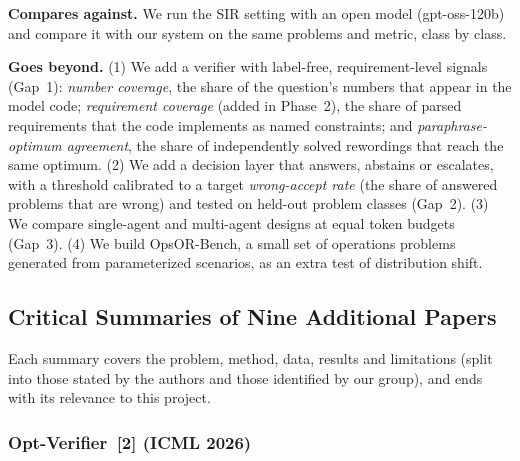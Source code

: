 \documentclass[11pt,a4paper]{article}
\begin{document}
\textbf{Compares against.} We run the SIR setting with an open model (gpt-oss-120b) and compare it with our system on the same problems and metric, class by class.

\textbf{Goes beyond.} (1) We add a verifier with label-free, requirement-level signals (Gap~1): \textit{number coverage}, the share of the question's numbers that appear in the model code; \textit{requirement coverage} (added in Phase~2), the share of parsed requirements that the code implements as named constraints; and \textit{paraphrase-optimum agreement}, the share of independently solved rewordings that reach the same optimum. (2) We add a decision layer that answers, abstains or escalates, with a threshold calibrated to a target \textit{wrong-accept rate} (the share of answered problems that are wrong) and tested on held-out problem classes (Gap~2). (3) We compare single-agent and multi-agent designs at equal token budgets (Gap~3). (4) We build OpsOR-Bench, a small set of operations problems generated from parameterized scenarios, as an extra test of distribution shift.

\subsection{Critical Summaries of Nine Additional Papers}
\label{sec:summaries}

Each summary covers the problem, method, data, results and limitations (split into those stated by the authors and those identified by our group), and ends with its relevance to this project.

\subsubsection[Opt-Verifier (ICML 2026)]{Opt-Verifier~[2] (ICML 2026)}
\end{document}
